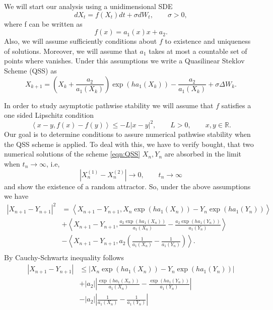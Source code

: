 We will start our analysis using a unidimensional SDE
\begin{equation}\label{eqn:1-dSDE}
	dX_t = f(X_t)dt +\sigma dW_t, \qquad \sigma>0,
\end{equation}
where f can be written as
\begin{equation}
	f(x) = a_1(x)x + a_2.
\end{equation}
Also, we will assume sufficiently conditions about $f$ to existence and uniqueness of solutions. Moreover, we will
assume that $a_1$  takes at most a countable set of points where vanishes. Under this assumptions we write a
Quasilinear Steklov Scheme (QSS) as
\begin{equation}\label{eqn:QSS}
	X_{k+1}=
		\left(
			X_k + \frac{a_2}{a_1(X_k)}
		\right)
		\exp
		\left(
			 h a_1(X_k)
		\right)
		-\frac{a_2}{a_1(X_k)}
		+\sigma \Delta W_k.
\end{equation}

In order to study asymptotic pathwise stability we will assume that $f$ satisfies a one sided Lipschitz condition
\begin{equation}
	\left <
		x-y, f(x)-f(y)
	\right> 
	\leq
	-L|x-y|^2 ,\qquad L>0, \qquad x,y \in \mathbb{R}.
\end{equation}
Our goal is to determine conditions to assure numerical pathwise stability when the QSS scheme is applied. To deal
with this, we have to verify bought, that two numerical solutions of the scheme \eqref{eqn:QSS} 
$X_n,Y_n$ are absorbed in the limit  when
$t_n \to \infty$, i.e, 
$$
|
	X_{n}^{(1)}
	- X_{n}^{(2)}
|\to 0, \qquad t_n \to \infty
$$
and show the existence of a random attractor.
So, under the above assumptions we have
\begin{align*}
	|X_{n+1}- Y_{n+1}|^2
	& =
	\left<
		X_{n+1}-Y_{n+1},
		X_n \exp \left(h a_1(X_n)\right)
		-Y_n \exp\left(h a_1(Y_n)\right) 
	\right>	\\
	&+
	\left<
		X_{n+1}-Y_{n+1},
		\frac{a_2 \exp(h a_1(X_n))}{a_1(X_n)} 
		-
		\frac{a_2 \exp(h a_1(Y_n))}{a_1(Y_n)}
	\right>	\\
	&-
	\left<
		X_{n+1}-Y_{n+1},
		a_2
		\left(
			\frac{1}{a_1(X_n)}
			-\frac{1}{a_1(Y_n)}
		\right) 
	\right>	.\\
\end{align*}
By Cauchy-Schwartz inequality follows
\begin{align*}
	\left|X_{n+1}- Y_{n+1}\right|
		&\leq	
		\left|
			X_n \exp \left(h a_1(X_n)\right)
			-Y_n \exp\left(h a_1(Y_n)\right) 
		\right|	\\
		&+
		|a_2|
		\left|
			\frac{\exp(h a_1(X_n))}{a_1(X_n)} 
			-
			\frac{\exp(h a_1(Y_n))}{a_1(Y_n)}
		\right|	\\
		&-
		|a_2|
		\left|
			\frac{1}{a_1(X_n)}
			-\frac{1}{a_1(Y_n)}
		\right|
\end{align*}
